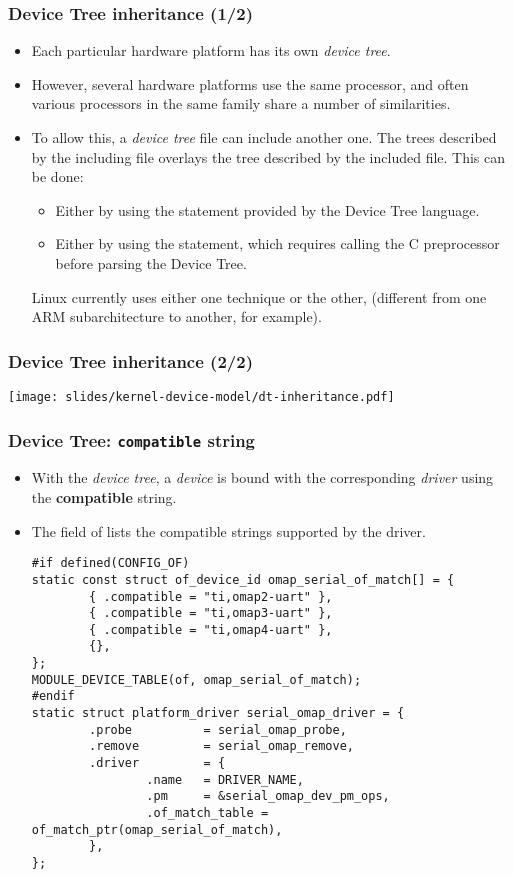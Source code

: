 \begin{frame}
  \frametitle{Device Tree inheritance (1/2)}
  \begin{itemize}
  \item Each particular hardware platform has its own {\em device tree}.
  \item However, several hardware platforms use the same processor,
    and often various processors in the same family share a number of
    similarities.
  \item To allow this, a {\em device tree} file can include another
    one. The trees described by the including file overlays the tree
    described by the included file. This can be done:
    \begin{itemize}
       \item Either by using the  statement 
	     provided by the Device Tree language. 
       \item Either by using the  statement,
   	     which requires calling the C preprocessor before
             parsing the Device Tree.
    \end{itemize}
    Linux currently uses either one technique or the other,
    (different from one ARM subarchitecture to another, for example).
  \end{itemize}
\end{frame}

\begin{frame}
  \frametitle{Device Tree inheritance (2/2)}
  \begin{center}
    \texttt{[image: slides/kernel-device-model/dt-inheritance.pdf]}
  \end{center}
\end{frame}

\begin{frame}[fragile]
  \frametitle{Device Tree: {\tt compatible} string}
  \begin{itemize}
  \item With the {\em device tree}, a {\em device} is bound with the
    corresponding {\em driver} using the {\bf compatible} string.
  \item The  field of 
    lists the compatible strings supported by the driver.
    \begin{block}{}
  \begin{verbatim}
#if defined(CONFIG_OF)
static const struct of_device_id omap_serial_of_match[] = {
        { .compatible = "ti,omap2-uart" },
        { .compatible = "ti,omap3-uart" },
        { .compatible = "ti,omap4-uart" },
        {},
};
MODULE_DEVICE_TABLE(of, omap_serial_of_match);
#endif
static struct platform_driver serial_omap_driver = {
        .probe          = serial_omap_probe,
        .remove         = serial_omap_remove,
        .driver         = {
                .name   = DRIVER_NAME,
                .pm     = &serial_omap_dev_pm_ops,
                .of_match_table = of_match_ptr(omap_serial_of_match),
        },
};
\end{verbatim}
\end{block}
  \end{itemize}
\end{frame}

